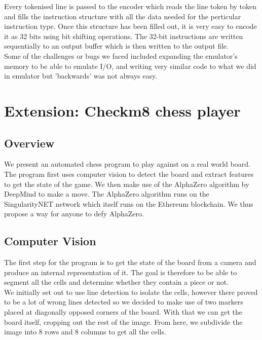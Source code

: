 \documentclass[11pt]{article}
\begin{document}
Every tokenised line is passed to the encoder which reads the line token by
token and fills the instruction structure with all the data needed for the
perticular instruction type. Once this structure has been filled out, it is very
easy to encode it as 32 bits using bit shifting operations. The 32-bit
instructions are written sequentially to an output buffer which is then written
to the output file.\\

Some of the challenges or bugs we faced included expanding the emulator's memory
to be able to emulate I/O, and writing very similar code to what we did in
emulator but 'backwards' was not always easy.\\

\section{Extension: Checkm8 chess player}

\subsection{Overview}

We present an automated chess program to play against on a real world board. The
program first uses computer vision to detect the board and extract features to
get the state of the game. We then make use of the AlphaZero algorithm by
DeepMind to make a move. The AlphaZero algorithm runs on the SingularityNET
network which itself runs on the Ethereum blockchain. We thus propose a way for
anyone to defy AlphaZero.\\

\subsection{Computer Vision}

The first step for the program is to get the state of the board from a camera
and produce an internal representation of it. The goal is therefore to be able
to segment all the cells and determine whether they contain a piece or not.\\ We
initially set out to use line detection to isolate the cells, however there
proved to be a lot of wrong lines detected so we decided to make use of two
markers placed at diagonally opposed corners of the board. With that we can get
the board itself, cropping out the rest of the image. From here, we subdivide
the image into 8 rows and 8 columns to get all the cells.\\
\end{document}
